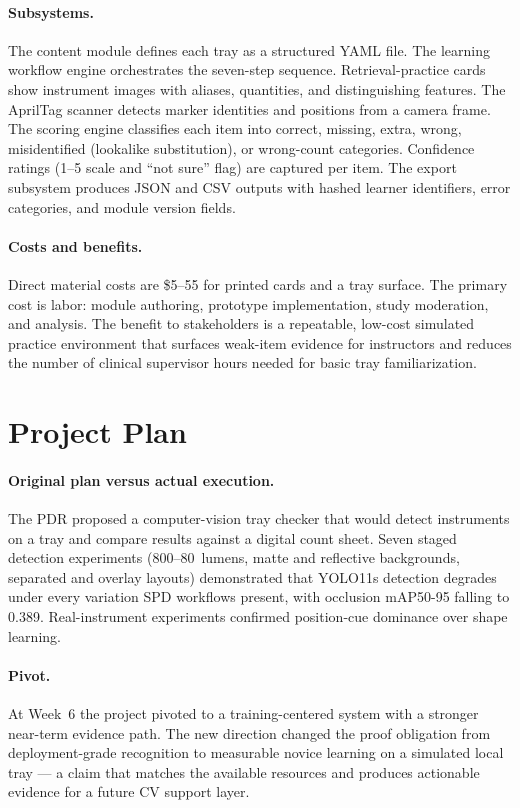 \documentclass[10pt]{article}
\begin{document}
\paragraph{Subsystems.}
The content module defines each tray as a structured YAML file. The learning
workflow engine orchestrates the seven-step sequence. Retrieval-practice cards
show instrument images with aliases, quantities, and distinguishing features.
The AprilTag scanner detects marker identities and positions from a camera
frame. The scoring engine classifies each item into correct, missing, extra,
wrong, misidentified (lookalike substitution), or wrong-count categories.
Confidence ratings (1--5 scale and ``not sure'' flag) are captured per item.
The export subsystem produces JSON and CSV outputs with hashed learner
identifiers, error categories, and module version fields.

\paragraph{Costs and benefits.}
Direct material costs are \$5--55 for printed cards and a tray surface. The
primary cost is labor: module authoring, prototype implementation, study
moderation, and analysis. The benefit to stakeholders is a repeatable, low-cost
simulated practice environment that surfaces weak-item evidence for instructors
and reduces the number of clinical supervisor hours needed for basic tray familiarization.

\section*{Project Plan}

\paragraph{Original plan versus actual execution.}
The PDR proposed a computer-vision tray checker that would detect instruments
on a tray and compare results against a digital count sheet. Seven staged
detection experiments (800--80~lumens, matte and reflective backgrounds,
separated and overlay layouts) demonstrated that YOLO11s detection degrades
under every variation SPD workflows present, with occlusion mAP50-95 falling to
0.389. Real-instrument experiments confirmed position-cue dominance over shape
learning.

\paragraph{Pivot.}
At Week~6 the project pivoted to a training-centered system with a stronger
near-term evidence path. The new direction changed the proof obligation from
deployment-grade recognition to measurable novice learning on a simulated local
tray --- a claim that matches the available resources and produces actionable
evidence for a future CV support layer.
\end{document}
